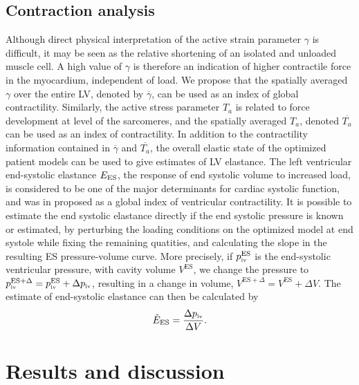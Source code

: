 \subsection{Contraction analysis}
Although direct physical interpretation of the active
  strain parameter $\gamma$ is difficult, it may be seen as the
  relative shortening of an isolated and unloaded muscle cell. A high
  value of $\gamma$ is therefore an indication of higher contractile
  force in the myocardium, independent of load. We propose that
  the spatially averaged $\gamma$ over the entire LV, denoted by  
  $\overline{\gamma}$, can be used as an index of global
  contractility. Similarly, the active stress parameter $T_a$ is related to force
  development at level of the sarcomeres\cite{goktepe2014generalized},
  and the spatially averaged 
  $T_a$, denoted $\overline{T_a}$ can be used as an index of
  contractility. In addition to the contractility information contained in 
$\overline{\gamma}$ and $\overline{T_a}$, the overall elastic state
of the optimized patient models 
can be used to give estimates of LV elastance. The left ventricular
end-systolic elastance $E_{\text{ES}}$, the response of end systolic volume to
increased load, is considered to be one of the major determinants for
cardiac systolic function, and was in \cite{sagawa1977end} proposed
as a global index of ventricular contractility.
It is possible to estimate the end systolic elastance directly 
if the end systolic pressure is known or estimated, 
by perturbing the loading conditions on the optimized model at end
systole while fixing the remaining quatities, and calculating the slope
in the resulting ES pressure-volume curve. More
precisely, if $p_{\textnormal{\tiny{lv}}}^{\text{ES}}$ is the end-systolic ventricular
pressure, with cavity volume $V^{\text{ES}}$, 
we change the pressure to $p_{\textnormal{\tiny{lv}}}^{\text{ES} + \Delta} =
p_{\textnormal{\tiny{lv}}}^{\text{ES}} + \Delta p_{\textnormal{\tiny{lv}}}$, resulting in a change in volume,
$V^{\text{ES} +\Delta} = V^{\text{ES}} + \Delta V$. The estimate of end-systolic
elastance can then be calculated by 
\begin{align}
  \tilde{E}_{\text{ES}} = \frac{\Delta p_{\textnormal{\tiny{lv}}}}{\Delta V}.
  \label{paper2:eq:estimate_elastance}
\end{align}



\section{Results and discussion}
\label{paper2:sec:results}


